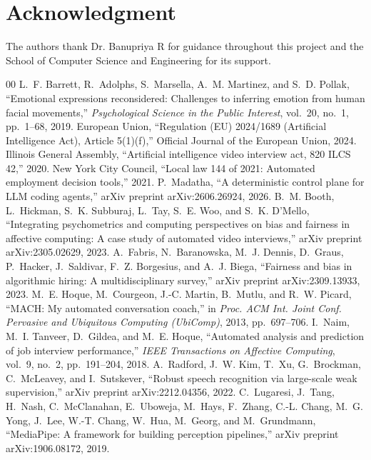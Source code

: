 \documentclass[conference]{IEEEtran}
\begin{document}
\section*{Acknowledgment}
The authors thank Dr. Banupriya R for guidance throughout this project and the School of Computer Science and Engineering for its support.

\begin{thebibliography}{00}
 L.~F. Barrett, R.~Adolphs, S.~Marsella, A.~M. Martinez, and S.~D. Pollak, ``Emotional expressions reconsidered: Challenges to inferring emotion from human facial movements,'' \textit{Psychological Science in the Public Interest}, vol.~20, no.~1, pp.~1--68, 2019.
 European Union, ``Regulation (EU) 2024/1689 (Artificial Intelligence Act), Article 5(1)(f),'' Official Journal of the European Union, 2024.
 Illinois General Assembly, ``Artificial intelligence video interview act, 820 ILCS 42,'' 2020.
 New York City Council, ``Local law 144 of 2021: Automated employment decision tools,'' 2021.
 P.~Madatha, ``A deterministic control plane for LLM coding agents,'' arXiv preprint arXiv:2606.26924, 2026.
 B.~M. Booth, L.~Hickman, S.~K. Subburaj, L.~Tay, S.~E. Woo, and S.~K. D'Mello, ``Integrating psychometrics and computing perspectives on bias and fairness in affective computing: A case study of automated video interviews,'' arXiv preprint arXiv:2305.02629, 2023.
 A.~Fabris, N.~Baranowska, M.~J. Dennis, D.~Graus, P.~Hacker, J.~Saldivar, F.~Z. Borgesius, and A.~J. Biega, ``Fairness and bias in algorithmic hiring: A multidisciplinary survey,'' arXiv preprint arXiv:2309.13933, 2023.
 M.~E. Hoque, M.~Courgeon, J.-C. Martin, B.~Mutlu, and R.~W. Picard, ``MACH: My automated conversation coach,'' in \textit{Proc. ACM Int. Joint Conf. Pervasive and Ubiquitous Computing (UbiComp)}, 2013, pp.~697--706.
 I.~Naim, M.~I. Tanveer, D.~Gildea, and M.~E. Hoque, ``Automated analysis and prediction of job interview performance,'' \textit{IEEE Transactions on Affective Computing}, vol.~9, no.~2, pp.~191--204, 2018.
 A.~Radford, J.~W. Kim, T.~Xu, G.~Brockman, C.~McLeavey, and I.~Sutskever, ``Robust speech recognition via large-scale weak supervision,'' arXiv preprint arXiv:2212.04356, 2022.
 C.~Lugaresi, J.~Tang, H.~Nash, C.~McClanahan, E.~Uboweja, M.~Hays, F.~Zhang, C.-L. Chang, M.~G. Yong, J.~Lee, W.-T. Chang, W.~Hua, M.~Georg, and M.~Grundmann, ``MediaPipe: A framework for building perception pipelines,'' arXiv preprint arXiv:1906.08172, 2019.

\end{thebibliography}
\end{document}
